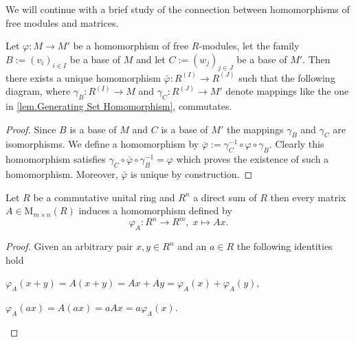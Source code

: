 We will continue with a brief study of the connection between homomorphisms of free modules and matrices.

\begin{pro}\label{prop.Commutative Diagram of Free Modules}
Let $\varphi\colon M\to M'$ be a homomorphism of free $R$-modules, let the family $B:=(v_i)_{i\in I}$ be a base of $M$ and let $C:=(w_j)_{j\in J}$ be a base of $M'$. Then there exists a unique homomorphism $\bar{\varphi}\colon R^{(I)}\to R^{(J)}$ such that the following diagram, where $\gamma_B\colon R^{(I)}\to M$ and $\gamma_C\colon R^{(J)}\to M'$ denote mappings like the one in \cref{lem.Generating Set Homomorphism}, commutates.
\begin{center}
\end{center}
\end{pro}
\begin{proof}
Since $B$ is a base of $M$ and $C$ is a base of $M'$ the mappings $\gamma_B$ and $\gamma_C$ are isomorphisms. We define a homomorphism by $\bar{\varphi}:=\gamma_C^{-1}\circ\varphi\circ\gamma_B$. Clearly this homomorphism satisfies $\gamma_C\circ\bar{\varphi}\circ\gamma_B^{-1}=\varphi$ which proves the existence of such a homomorphism. Moreover, $\bar{\varphi}$ is unique by construction.
\end{proof}

\begin{cor}\label{cor.Matrix implies Homomorphism}
Let $R$ be a commutative unital ring and $R^n$ a direct sum of $R$ then every matrix $A\in\mathrm{M}_{m\times n}(R)$ induces a homomorphism defined by
\begin{equation*}
\varphi_A\colon R^n\to R^m,\; x\mapsto Ax.
\end{equation*}
\end{cor}
\begin{proof}
Given an arbitrary pair $x,y\in R^n$ and an $a\in R$ the following identities hold
\begin{exlist}
\item $\varphi_A(x+y)=A(x+y)=Ax+Ay=\varphi_A(x)+\varphi_A(y)$,
\item $\varphi_A(ax)=A(ax)=aAx=a\varphi_A(x)$.
\end{exlist}
\end{proof}

